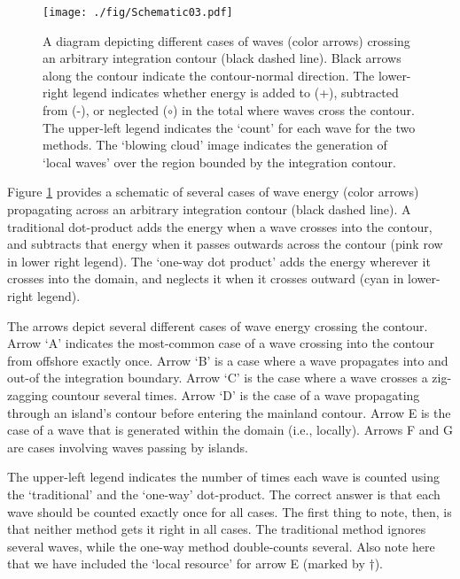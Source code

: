 \begin{figure}[ht]
    \centering
    \texttt{[image: ./fig/Schematic03.pdf]}
    \caption{A diagram depicting different cases of waves (color arrows) crossing an arbitrary integration contour (black dashed line). Black arrows along the contour indicate the contour-normal direction. The lower-right legend indicates whether energy is added to (+), subtracted from (-), or neglected ($\circ$) in the total where waves cross the contour. The upper-left legend indicates the `count' for each wave for the two methods. The `blowing cloud' image indicates the generation of `local waves' over the region bounded by the integration contour.}
    \label{fig:one-way-diagram}
\end{figure}

Figure \ref{fig:one-way-diagram} provides a schematic of several cases of wave energy (color arrows) propagating across an arbitrary integration contour (black dashed line). A traditional dot-product adds the energy when a wave crosses into the contour, and subtracts that energy when it passes outwards across the contour (pink row in lower right legend). The `one-way dot product' adds the energy wherever it crosses into the domain, and neglects it when it crosses outward (cyan in lower-right legend).

The arrows depict several different cases of wave energy crossing the contour. Arrow `A' indicates the most-common case of a wave crossing into the contour from offshore exactly once. Arrow `B' is a case where a wave propagates into and out-of the integration boundary. Arrow `C' is the case where a wave crosses a zig-zagging countour several times. Arrow `D' is the case of a wave propagating through an island's contour before entering the mainland contour. Arrow E is the case of a wave that is generated within the domain (i.e., locally). Arrows F and G are cases involving waves passing by islands.

The upper-left legend indicates the number of times each wave is counted using the `traditional' and the `one-way' dot-product. The correct answer is that each wave should be counted exactly once for all cases. The first thing to note, then, is that neither method gets it right in all cases. The traditional method ignores several waves, while the one-way method double-counts several. Also note here that we have included the `local resource' for arrow E (marked by $\dagger$).

